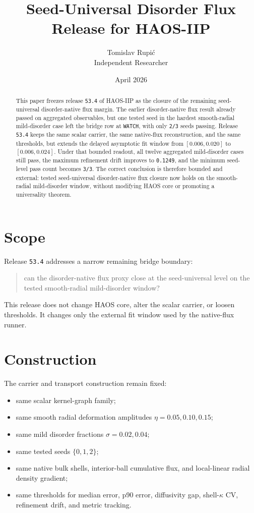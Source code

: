 \documentclass[11pt]{article}
\title{Seed-Universal Disorder Flux Release for HAOS-IIP}
\author{Tomislav Rupi\'c \\ Independent Researcher}
\date{April 2026}
\begin{document}
\maketitle

\begin{abstract}
This paper freezes release \texttt{53.4} of HAOS-IIP as the closure of the remaining seed-universal disorder-native flux margin. The earlier disorder-native flux result already passed on aggregated observables, but one tested seed in the hardest smooth-radial mild-disorder case left the bridge row at \texttt{WATCH}, with only \texttt{2/3} seeds passing. Release \texttt{53.4} keeps the same scalar carrier, the same native-flux reconstruction, and the same thresholds, but extends the delayed asymptotic fit window from \([0.006, 0.020]\) to \([0.006, 0.024]\). Under that bounded readout, all twelve aggregated mild-disorder cases still pass, the maximum refinement drift improves to \texttt{0.1249}, and the minimum seed-level pass count becomes \texttt{3/3}. The correct conclusion is therefore bounded and external: tested seed-universal disorder-native flux closure now holds on the smooth-radial mild-disorder window, without modifying HAOS core or promoting a universality theorem.
\end{abstract}

\tableofcontents

\section{Scope}

Release \texttt{53.4} addresses a narrow remaining bridge boundary:
\begin{quote}
can the disorder-native flux proxy close at the seed-universal level on the tested smooth-radial mild-disorder window?
\end{quote}

This release does not change HAOS core, alter the scalar carrier, or loosen thresholds. It changes only the external fit window used by the native-flux runner.

\section{Construction}

The carrier and transport construction remain fixed:
\begin{itemize}
\item same scalar kernel-graph family;
\item same smooth radial deformation amplitudes \(\eta = 0.05, 0.10, 0.15\);
\item same mild disorder fractions \(\sigma = 0.02, 0.04\);
\item same tested seeds \(\{0,1,2\}\);
\item same native bulk shells, interior-ball cumulative flux, and local-linear radial density gradient;
\item same thresholds for median error, p90 error, diffusivity gap, shell-\(\kappa\) CV, refinement drift, and metric tracking.
\end{itemize}
\end{document}
